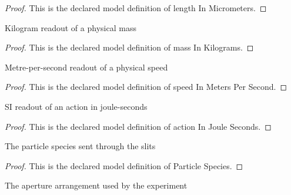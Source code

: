 \begin{proof}
  This is the declared model definition of length In Micrometers.
\end{proof}
\begin{definition}
  \label{def:physics:phyx-mini-0500:phyxminiproblems-problemphyxmini0500-massinkilograms}
  Kilogram readout of a physical mass
\end{definition}
\begin{proof}
  This is the declared model definition of mass In Kilograms.
\end{proof}
\begin{definition}
  \label{def:physics:phyx-mini-0500:phyxminiproblems-problemphyxmini0500-speedinmeterspersecond}
  Metre-per-second readout of a physical speed
\end{definition}
\begin{proof}
  This is the declared model definition of speed In Meters Per Second.
\end{proof}
\begin{definition}
  \label{def:physics:phyx-mini-0500:phyxminiproblems-problemphyxmini0500-actioninjouleseconds}
  SI readout of an action in joule-seconds
\end{definition}
\begin{proof}
  This is the declared model definition of action In Joule Seconds.
\end{proof}
\begin{definition}
  \label{def:physics:phyx-mini-0500:phyxminiproblems-problemphyxmini0500-particlespecies}
  The particle species sent through the slits
\end{definition}
\begin{proof}
  This is the declared model definition of Particle Species.
\end{proof}
\begin{definition}
  \label{def:physics:phyx-mini-0500:phyxminiproblems-problemphyxmini0500-slitarrangement}
  The aperture arrangement used by the experiment
\end{definition}
